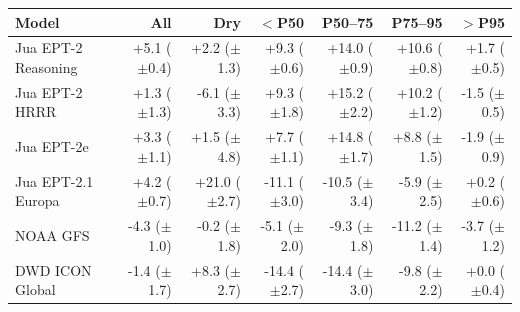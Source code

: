 \begin{tabular}{lrrrrrr}
\toprule
Model & All & Dry & $<$P50 & P50--75 & P75--95 & $>$P95 \\
\midrule
Jua EPT-2 Reasoning & +5.1 ($\pm$0.4) & +2.2 ($\pm$1.3) & +9.3 ($\pm$0.6) & +14.0 ($\pm$0.9) & +10.6 ($\pm$0.8) & +1.7 ($\pm$0.5) \\
Jua EPT-2 HRRR & +1.3 ($\pm$1.3) & -6.1 ($\pm$3.3) & +9.3 ($\pm$1.8) & +15.2 ($\pm$2.2) & +10.2 ($\pm$1.2) & -1.5 ($\pm$0.5) \\
Jua EPT-2e & +3.3 ($\pm$1.1) & +1.5 ($\pm$4.8) & +7.7 ($\pm$1.1) & +14.8 ($\pm$1.7) & +8.8 ($\pm$1.5) & -1.9 ($\pm$0.9) \\
Jua EPT-2.1 Europa & +4.2 ($\pm$0.7) & +21.0 ($\pm$2.7) & -11.1 ($\pm$3.0) & -10.5 ($\pm$3.4) & -5.9 ($\pm$2.5) & +0.2 ($\pm$0.6) \\
NOAA GFS & -4.3 ($\pm$1.0) & -0.2 ($\pm$1.8) & -5.1 ($\pm$2.0) & -9.3 ($\pm$1.8) & -11.2 ($\pm$1.4) & -3.7 ($\pm$1.2) \\
DWD ICON Global & -1.4 ($\pm$1.7) & +8.3 ($\pm$2.7) & -14.4 ($\pm$2.7) & -14.4 ($\pm$3.0) & -9.8 ($\pm$2.2) & +0.0 ($\pm$0.4) \\
\bottomrule
\end{tabular}

